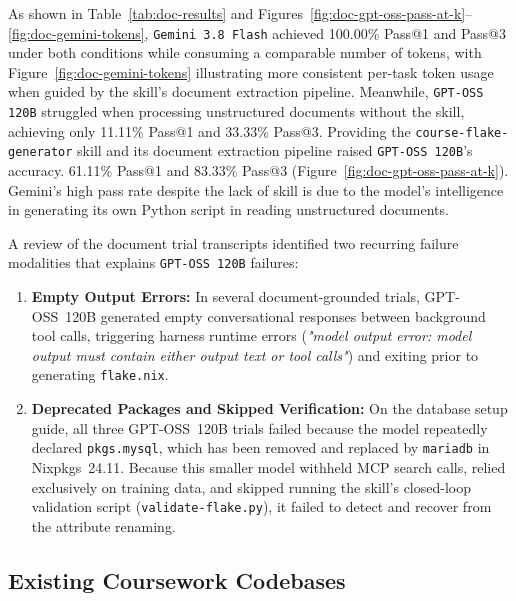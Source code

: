 As shown in Table~\ref{tab:doc-results} and Figures~\ref{fig:doc-gpt-oss-pass-at-k}--\ref{fig:doc-gemini-tokens},
\texttt{Gemini 3.8 Flash} achieved 100.00\% Pass@1 and Pass@3 under both
conditions while consuming a comparable number of tokens, with Figure~\ref{fig:doc-gemini-tokens}
illustrating more consistent per-task token usage when guided by the skill's document
extraction pipeline. Meanwhile, \texttt{GPT-OSS 120B} struggled when processing
unstructured documents without the skill, achieving only 11.11\% Pass@1 and
33.33\% Pass@3. Providing the \texttt{course-flake-generator} skill and its document
extraction pipeline raised \texttt{GPT-OSS 120B}'s accuracy. 61.11\% Pass@1 and
83.33\% Pass@3 (Figure~\ref{fig:doc-gpt-oss-pass-at-k}). Gemini's high pass rate
despite the lack of skill is due to the model's intelligence in generating its
own Python script in reading unstructured documents.

A review of the document trial transcripts identified two recurring failure
modalities that explains \texttt{GPT-OSS 120B} failures:

\begin{enumerate}
	\item \textbf{Empty Output Errors:} In several document-grounded trials, GPT-OSS~120B
	      generated empty conversational responses between background tool calls,
	      triggering harness runtime errors (\textit{"model output error: model
		      output must contain either output text or tool calls"}) and exiting prior
	      to generating \texttt{flake.nix}.

	\item \textbf{Deprecated Packages and Skipped Verification:} On the database
	      setup guide, all three GPT-OSS~120B trials failed because the model repeatedly
	      declared \texttt{pkgs.mysql}, which has been removed and replaced by \texttt{mariadb}
	      in Nixpkgs~24.11. Because this smaller model withheld MCP search calls,
	      relied exclusively on training data, and skipped running the skill's closed-loop
	      validation script (\texttt{validate-flake.py}), it failed to detect and recover
	      from the attribute renaming.
\end{enumerate}

\subsection{Existing Coursework Codebases}
\label{subsec:codebase-results}\label{subsec:codebase-doc-results}

